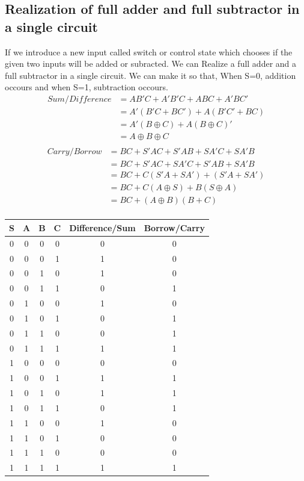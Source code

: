 \documentclass[a4paper, 12pt]{article}
\begin{document}
\pagebreak
\subsection{Realization of full adder and full subtractor in a single circuit}
If we introduce a new input called switch or control state which chooses if the given two inputs will be added or subracted. We can Realize
a full adder and a full subtractor in a single circuit. We can make it so that, When S=0, addition occours and when S=1, subtraction occours.
\begin{equation}
\begin{split}
	Sum/Difference &= AB'C + A'B'C + ABC + A'BC' \\
			& = A'(B'C + BC') + A(B'C' + BC) \\
			& = A'(B \oplus C) + A (B \oplus C)' \\
			& = A \oplus B \oplus C \\
\end{split}
\end{equation}
\begin{equation}
\begin{split}
	Carry/Borrow &= BC + S'AC + S'AB + SA'C + SA'B \\
							 &= BC + S'AC + SA'C + S'AB + SA'B \\
							 &= BC + C(S'A + SA') +(S'A + SA') \\
							 &= BC + C(A \oplus S) + B(S \oplus A) \\
							 &= BC + (A\oplus B)(B+C) \\
\end{split}
\end{equation}

\begin{center}
	\begin{tabular}[h]{|c|c|c|c|c|c|}
	\hline
	S & A & B & C & Difference/Sum & Borrow/Carry \\
	\hline
	0 & 0 & 0 & 0 & 0 & 0 \\
	0 & 0 & 0 & 1 & 1 & 0 \\
	0 & 0 & 1 & 0 & 1 & 0 \\
	0 & 0 & 1 & 1 & 0 & 1 \\
	0 & 1 & 0 & 0 & 1 & 0 \\
	0 & 1 & 0 & 1 & 0 & 1 \\
	0 & 1 & 1 & 0 & 0 & 1 \\
	0 & 1 & 1 & 1 & 1 & 1 \\
	1 & 0 & 0 & 0 & 0 & 0 \\
	1 & 0 & 0 & 1 & 1 & 1 \\
	1 & 0 & 1 & 0 & 1 & 1 \\
	1 & 0 & 1 & 1 & 0 & 1 \\
	1 & 1 & 0 & 0 & 1 & 0 \\
	1 & 1 & 0 & 1 & 0 & 0 \\
	1 & 1 & 1 & 0 & 0 & 0 \\
	1 & 1 & 1 & 1 & 1 & 1 \\
	\hline
	\end{tabular}
\end{center}
\pagebreak
\end{document}
